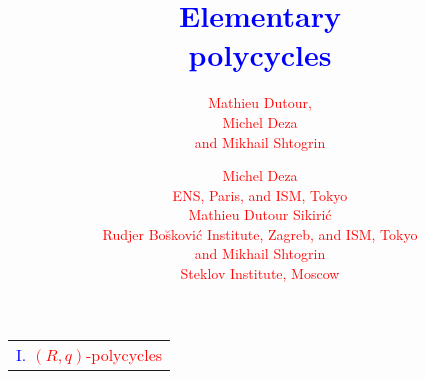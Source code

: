 \documentclass[%
pdf,
colorBG,
slideColor,
]{prosper}
\title{\Huge \textcolor{blue}{Elementary}\\[3mm]
\textcolor{blue}{polycycles}}
\author{
\textcolor{red}{\Large Mathieu Dutour,}\\[2mm]
\textcolor{red}{\Large Michel Deza}\\[2mm]
\textcolor{red}{\Large and Mikhail Shtogrin}\\
}
\author{
\begin{multicols}{2}
\textcolor{red}{\Large Michel Deza}\\[2mm]
\textcolor{red}{\large ENS, Paris, and ISM, Tokyo}\\[2mm]
\textcolor{red}{\Large Mathieu Dutour Sikiri\'c}\\[2mm]
\textcolor{red}{\large Rudjer Bo\u skovi\'c Institute, Zagreb, and ISM, Tokyo}
\end{multicols}
\begin{center}
\textcolor{red}{\Large and Mikhail Shtogrin}\\[2mm]
\textcolor{red}{\large Steklov Institute, Moscow}
\end{center}
}
\date{}
\begin{document}
\maketitle








%


































\begin{slide}{}
\begin{center}
{\Huge 
\begin{tabular*}{8cm}{c}
\\[-0.5cm]
\textcolor{blue}{I. }\textcolor{red}{$(R,q)$-polycycles}\\
\end{tabular*}
}
\end{center}
\end{slide}
\end{document}

